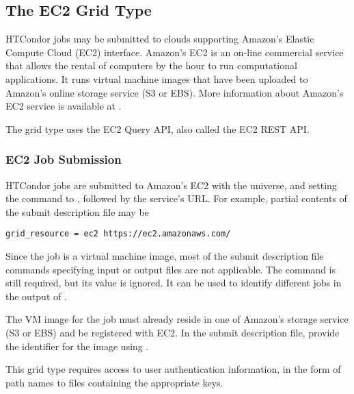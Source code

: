 \subsection{\label{sec:Amazon}The EC2 Grid Type }

HTCondor jobs may be submitted to clouds supporting
Amazon's Elastic Compute Cloud (EC2) interface.
Amazon's EC2 is an on-line commercial service that allows 
the rental of computers by the hour to run computational applications.
It runs virtual machine images that have been uploaded to Amazon's
online storage service (S3 or EBS).
More information about Amazon's EC2 service is available at
.

The  grid type uses the EC2 Query API,
also called the EC2 REST API.

\subsubsection{\label{sec:Amazon-submit}EC2 Job Submission}

HTCondor jobs are submitted to Amazon's EC2
with the  universe, and setting the
 command to , followed 
by the service's URL. For example,
partial contents of the submit description file may be
\begin{verbatim}
grid_resource = ec2 https://ec2.amazonaws.com/
\end{verbatim}

Since the job is a virtual machine image,
most of the submit description file commands
specifying input or output files are not applicable.
The  command is still required,
but its value is ignored. 
It can be used to identify different jobs in the output of .

The VM image for the job must already reside in one of Amazon's storage
service (S3 or EBS) and be registered with EC2.
In the submit description file,
provide the identifier for the image using .

This grid type requires access to user authentication information,
in the form of path names to files containing the appropriate keys.

